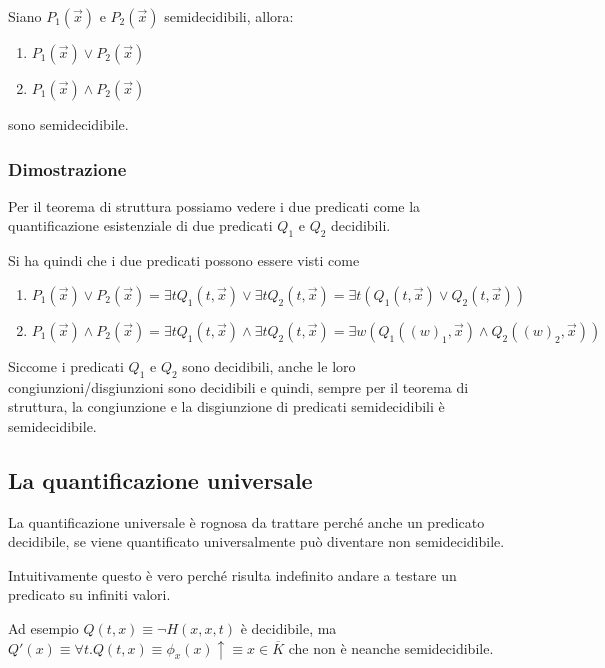  Siano $P_1(\vec{x})$ e $P_2(\vec{x})$ semidecidibili, allora:
 
 \begin{enumerate}
 	\item $P_1(\vec{x}) \vee P_2(\vec{x})$
 	\item $P_1(\vec{x}) \wedge P_2(\vec{x})$
 \end{enumerate}
 
 sono semidecidibile.
 
 \subsubsection{Dimostrazione}
 
 Per il teorema di struttura possiamo vedere i due predicati come la quantificazione esistenziale di due predicati $Q_1$ e $Q_2$ decidibili.
 
 Si ha quindi che i due predicati possono essere visti come
 
 \begin{enumerate}
	 \item $P_1(\vec{x}) \vee P_2(\vec{x}) = \exists t Q_1(t,\vec{x}) \vee \exists t Q_2(t,\vec{x}) = \exists t ( Q_1(t,\vec{x}) \vee Q_2(t,\vec{x}))$
	 \item  $P_1(\vec{x}) \wedge P_2(\vec{x}) = \exists t Q_1(t,\vec{x}) \wedge \exists t Q_2(t,\vec{x}) = \exists w ( Q_1((w)_1,\vec{x}) \wedge Q_2((w)_2,\vec{x}))$
 \end{enumerate}
 
 Siccome i predicati $Q_1$ e $Q_2$ sono decidibili, anche le loro congiunzioni/disgiunzioni sono decidibili e quindi, sempre per il teorema di struttura, la congiunzione e la disgiunzione di predicati semidecidibili è semidecidibile.
 
 \subsection{La quantificazione universale}
 
 La quantificazione universale è rognosa da trattare perché anche un predicato decidibile, se viene quantificato universalmente può diventare non semidecidibile.
 
 Intuitivamente questo è vero perché risulta indefinito andare a testare un predicato su infiniti valori.
 
 Ad esempio $Q(t,x) \equiv \neg H(x,x,t)$ è decidibile, ma $Q'(x) \equiv \forall t . Q(t,x) \equiv \phi_x(x) \uparrow \equiv x \in \overline{K}$ che non è neanche semidecidibile.
 
